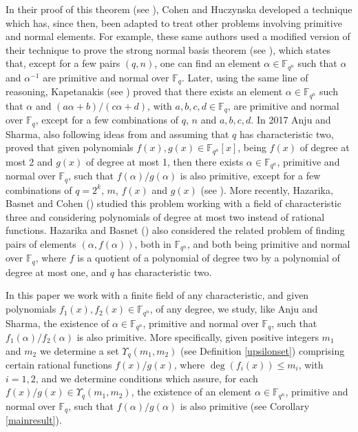 \documentclass[12pt]{article}
\newcommand{\F}{\mathbb{F}}
\begin{document}
In their proof of this theorem (see \cite{CH}), Cohen and Huczynska developed a 
technique which 
has, since then, been adapted to treat other problems involving primitive and 
normal elements. For example, these same authors used a modified version of 
their technique to prove the strong normal basis theorem (see \cite{CH2}), 
which states that, 
except for a few pairs $(q,n)$, one can find an element $\alpha \in      
\mathbb{F}_{q^n}$  such that $\alpha$ and $\alpha^{-1}$ are primitive and 
normal over $\F_q$. Later, using the same line of reasoning, Kapetanakis (see 
\cite{kapeta})  proved 
that there exists 
an element $\alpha \in      
\mathbb{F}_{q^n}$  such that $\alpha$ and $(a \alpha + b)/(c \alpha + d)$, with 
$a,b,c,d \in  \F_q$, are 
primitive and 
normal over $\F_q$, except for a few combinations of $q$, $n$ and $a,b,c,d$. 
In 2017 Anju and Sharma, also following ideas from \cite{CH} and assuming that 
$q$ has characteristic two, proved that given polynomials $f(x), g(x) \in 
\F_{q^n}[x]$,  being $f(x)$ of degree at most 2 and $g(x)$ of degree at most 1, 
then there exists $\alpha \in \F_{q^n}$, primitive and normal over $\F_q$, such 
that $f(\alpha)/g(\alpha)$ is also primitive, except for a few combinations of 
$q = 2^k$, $m$, $f(x)$ and 
$g(x)$ (see \cite{mersenne}).  
More recently, Hazarika, Basnet and Cohen (\cite{HBC}) studied this problem 
working with a field of characteristic three and considering polynomials    
of degree at most two instead of rational functions. Hazarika and Basnet 
(\cite{HB})  also 
considered the related problem of finding pairs of elements $(\alpha, 
f(\alpha))$, both in $\F_{q^n}$, and both being primitive and normal over 
$\F_q$, where $f$ is a quotient of a polynomial of degree two by a polynomial 
of degree at most one, and $q$ has characteristic two.

In this paper we work with a finite field of any characteristic, and given 
polynomials 
$f_1(x), f_2(x) \in  \F_{q^n}$, of any degree,  we study, like Anju and Sharma, 
the 
existence of $\alpha \in \F_{q^n}$, primitive and normal over $\F_q$, such that
$f_1(\alpha)/f_2(\alpha)$ 
is also primitive. More specifically, given positive 
integers $m_1$ and $m_2$ we determine a set $\Upsilon_q(m_1, m_2)$ (see 
Definition \ref{upsilonset}) comprising 
certain rational functions $f(x)/g(x)$, where $\deg(f_i(x)) \leq m_i$, with $i 
= 1,2$,  and we determine conditions which assure, for each $f(x)/g(x) \in 
\Upsilon_q(m_1, m_2)$,  the existence of an element   
$\alpha \in \F_{q^n}$, primitive and normal over $\F_q$, such 
that $f(\alpha)/g(\alpha)$ is also primitive (see Corollary \ref{mainresult}).
\end{document}
